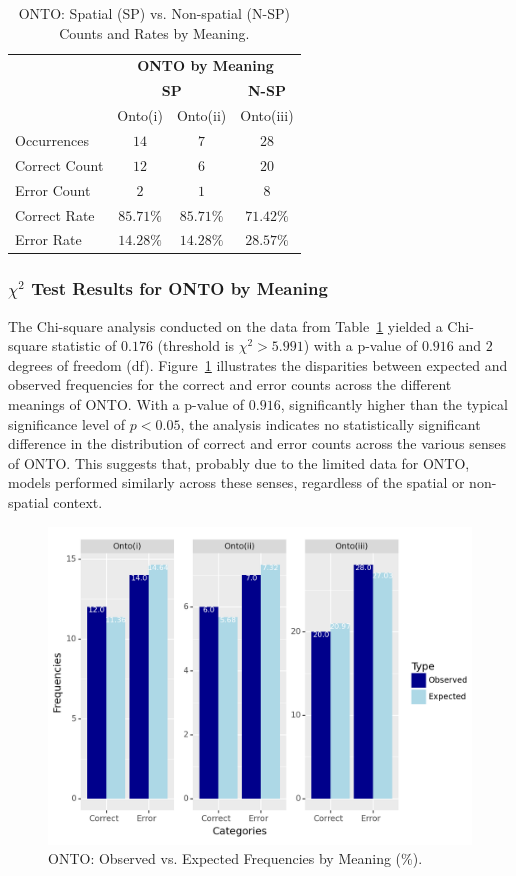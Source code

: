 \begin{table}[htb]
\centering
\begin{tabular}{lccc}
\toprule
 & \multicolumn{3}{c}{\textbf{ONTO by Meaning}} \\ 
 & \multicolumn{2}{c}{\textbf{SP}} & \textbf{N-SP} \\ 
 & Onto(i) & Onto(ii) & Onto(iii) \\
\midrule
Occurrences & $14$ & $7$ & $28$ \\ 
Correct Count & $12$ & $6$ & $20$ \\ 
Error Count & $2$ & $1$ & $8$ \\ 
\midrule
Correct Rate & $\mathbf{85.71\%}$ & $\mathbf{85.71\%}$ & $71.42\%$ \\ 
\midrule
Error Rate & $14.28\%$ & $14.28\%$ & $\mathbf{28.57\%}$ \\ 
\bottomrule
\end{tabular}
\caption{ONTO: Spatial (SP) vs. Non-spatial (N-SP) Counts and Rates by Meaning.}
\label{tab:onto-mean}
\end{table}

\subsubsection{$\chi^2$ Test Results for ONTO by Meaning} 

The Chi-square analysis conducted on the data from Table~\ref{tab:onto-mean} yielded a Chi-square statistic of $0.176$ (threshold is $\chi^2 > 5.991$) with a p-value of $0.916$ and $2$ degrees of freedom (df). Figure~\ref{fig: onto-mean-chi} illustrates the disparities between expected and observed frequencies for the correct and error counts across the different meanings of ONTO. With a p-value of $0.916$, significantly higher than the typical significance level of $p < 0.05$, the analysis indicates no statistically significant difference in the distribution of correct and error counts across the various senses of ONTO. This suggests that, probably due to the limited data for ONTO, models performed similarly across these senses, regardless of the spatial or non-spatial context.

\begin{figure}[htb]
        \centering
        \includegraphics[width=.7\textwidth]{textual/Figuras/Results/Unknown-78.png}
        \caption{ONTO: Observed vs. Expected Frequencies by Meaning (\%).}
        \label{fig: onto-mean-chi}
\end{figure}

